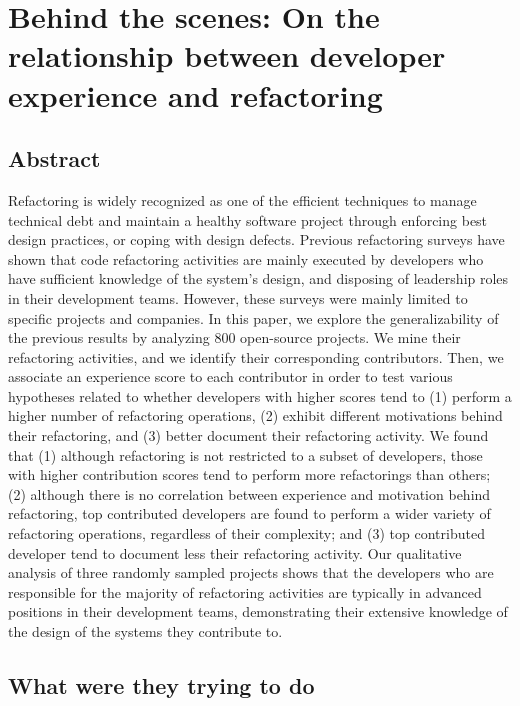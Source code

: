 \section{Behind the scenes: On the relationship between developer experience and refactoring}

\subsection{Abstract}

Refactoring is widely recognized as one of the efficient techniques to manage technical debt and maintain a healthy software project through enforcing best design practices, or coping with design defects. Previous refactoring surveys have shown that code refactoring activities are mainly executed by developers who have sufficient knowledge of the system's design, and disposing of leadership roles in their development teams. However, these surveys were mainly limited to specific projects and companies. In this paper, we explore the generalizability of the previous results by analyzing 800 open-source projects. We mine their refactoring activities, and we identify their corresponding contributors. Then, we associate an experience score to each contributor in order to test various hypotheses related to whether developers with higher scores tend to (1) perform a higher number of refactoring operations, (2) exhibit different motivations behind their refactoring, and (3) better document their refactoring activity. We found that (1) although refactoring is not restricted to a subset of developers, those with higher contribution scores tend to perform more refactorings than others; (2) although there is no correlation between experience and motivation behind refactoring, top contributed developers are found to perform a wider variety of refactoring operations, regardless of their complexity; and (3) top contributed developer tend to document less their refactoring activity. Our qualitative analysis of three randomly sampled projects shows that the developers who are responsible for the majority of refactoring activities are typically in advanced positions in their development teams, demonstrating their extensive knowledge of the design of the systems they contribute to.

\subsection{What were they trying to do}

